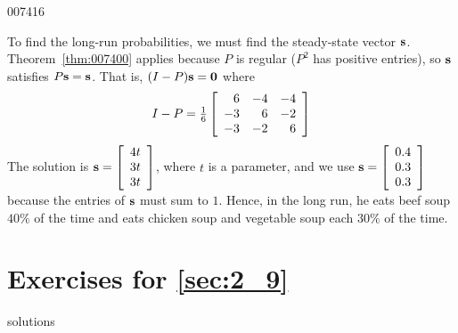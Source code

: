 \begin{example}{}{007416}
\begin{solution}
\hspace*{0.5em} To find the long-run probabilities, we must find the steady-state vector $\textbf{s}$. Theorem~\ref{thm:007400} applies because $P$ is regular ($P^{2}$ has positive entries), so $\textbf{s}$ satisfies $P\textbf{s} = \textbf{s}$. That is, $(I - P)\textbf{s} = \textbf{0}$ where
\begin{equation*}
I - P = \tfrac{1}{6} \left[ \begin{array}{rrr}
6 & -4 & -4 \\
-3 & 6 & -2 \\
-3 & -2 & 6
\end{array} \right]
\end{equation*}
The solution is $\textbf{s} = \left[ \begin{array}{r}
4t \\
3t \\
3t
\end{array} \right]$,
 where $t$ is a parameter, and we use $\textbf{s} = \left[ \begin{array}{r}
 0.4 \\
 0.3 \\
 0.3
 \end{array} \right]$
 because the entries of $\textbf{s}$ must sum to $1$. Hence, in the long run, he eats beef soup $40\%$ of the time and eats chicken soup and vegetable soup each $30\%$ of the time.
\end{solution}
\end{example}

\section*{Exercises for \ref{sec:2_9}}

\begin{Filesave}{solutions}
\end{Filesave}

